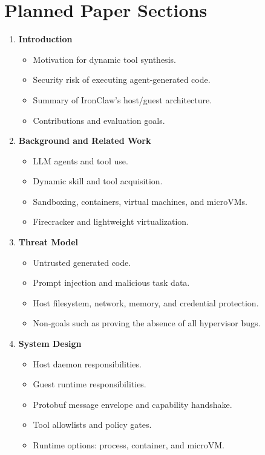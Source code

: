 \section{Planned Paper Sections}
\begin{enumerate}
    \item \textbf{Introduction}
    \begin{itemize}
        \item Motivation for dynamic tool synthesis.
        \item Security risk of executing agent-generated code.
        \item Summary of IronClaw's host/guest architecture.
        \item Contributions and evaluation goals.
    \end{itemize}

    \item \textbf{Background and Related Work}
    \begin{itemize}
        \item LLM agents and tool use.
        \item Dynamic skill and tool acquisition.
        \item Sandboxing, containers, virtual machines, and microVMs.
        \item Firecracker and lightweight virtualization.
    \end{itemize}

    \item \textbf{Threat Model}
    \begin{itemize}
        \item Untrusted generated code.
        \item Prompt injection and malicious task data.
        \item Host filesystem, network, memory, and credential protection.
        \item Non-goals such as proving the absence of all hypervisor bugs.
    \end{itemize}

    \item \textbf{System Design}
    \begin{itemize}
        \item Host daemon responsibilities.
        \item Guest runtime responsibilities.
        \item Protobuf message envelope and capability handshake.
        \item Tool allowlists and policy gates.
        \item Runtime options: process, container, and microVM.
    \end{itemize}


\end{enumerate}
